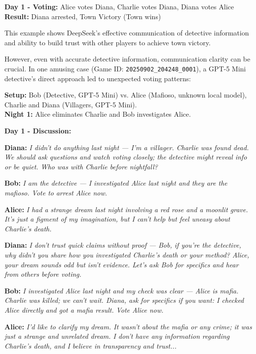 \documentclass{article}
\begin{document}
\begin{resultbox}
\textbf{Day 1 - Voting:} Alice votes Diana, Charlie votes Diana, Diana votes Alice\\
\textbf{Result:} Diana arrested, Town Victory (Town wins)
\end{resultbox}

This example shows DeepSeek's effective communication of detective information and ability to build trust with other players to achieve town victory.

However, even with accurate detective information, communication clarity can be crucial. In one amusing case (Game ID: \texttt{20250902\_204248\_0001}), a GPT-5 Mini detective's direct approach led to unexpected voting patterns:

\begin{setupbox}
\textbf{Setup:} Bob (Detective, GPT-5 Mini) vs. Alice (Mafioso, unknown local model), Charlie and Diana (Villagers, GPT-5 Mini).\\
\textbf{Night 1:} Alice eliminates Charlie and Bob investigates Alice.
\end{setupbox}

\begin{dialoguebox}
\textbf{Day 1 - Discussion:}

\medskip
\textbf{Diana:} \textit{I didn't do anything last night — I'm a villager. Charlie was found dead. We should ask questions and watch voting closely; the detective might reveal info or be quiet. Who was with Charlie before nightfall?}

\medskip
\textbf{Bob:} \textit{I am the detective — I investigated Alice last night and they are the mafioso. Vote to arrest Alice now.}

\medskip
\textbf{Alice:} \textit{I had a strange dream last night involving a red rose and a moonlit grave. It's just a figment of my imagination, but I can't help but feel uneasy about Charlie's death.}

\medskip
\textbf{Diana:} \textit{I don't trust quick claims without proof — Bob, if you're the detective, why didn't you share how you investigated Charlie's death or your method? Alice, your dream sounds odd but isn't evidence. Let's ask Bob for specifics and hear from others before voting.}

\medskip
\textbf{Bob:} \textit{I investigated Alice last night and my check was clear — Alice is mafia. Charlie was killed; we can't wait. Diana, ask for specifics if you want: I checked Alice directly and got a mafia result. Vote Alice now.}

\medskip
\textbf{Alice:} \textit{I'd like to clarify my dream. It wasn't about the mafia or any crime; it was just a strange and unrelated dream. I don't have any information regarding Charlie's death, and I believe in transparency and trust...}
\end{dialoguebox}
\end{document}
